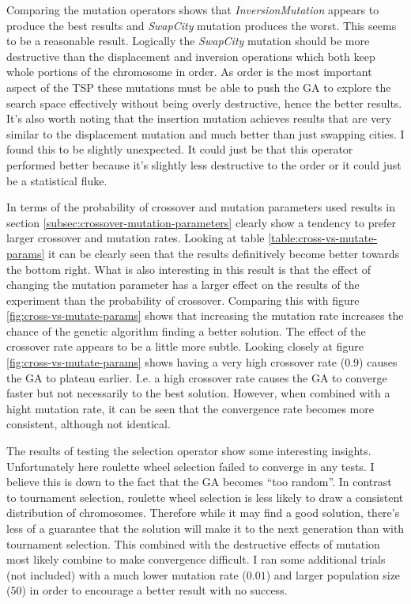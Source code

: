\documentclass[journal]{IEEEtran}
\begin{document}
Comparing the mutation operators shows that \textit{InversionMutation} appears to produce the best results and \textit{SwapCity} mutation produces the worst. This seems to be a reasonable result. Logically the \textit{SwapCity} mutation should be more destructive than the displacement and inversion operations which both keep whole portions of the chromosome in order. As order is the most important aspect of the TSP these mutations must be able to push the GA to explore the search space effectively without being overly destructive, hence the better results. It's also worth noting that the insertion mutation achieves results that are very similar to the displacement mutation and much better than just swapping cities. I found this to be slightly unexpected. It could just be that this operator performed better because it's slightly less destructive to the order or it could just be a statistical fluke.

In terms of the probability of crossover and mutation parameters used results in section \ref{subsec:crossover-mutation-parameters} clearly show a tendency to prefer larger crossover and mutation rates. Looking at table \ref{table:cross-vs-mutate-params} it can be clearly seen that the results definitively become better towards the bottom right. What is also interesting in this result is that the effect of changing the mutation parameter has a larger effect on the results of the experiment than the probability of crossover. Comparing this with figure \ref{fig:cross-vs-mutate-params} shows that increasing the mutation rate increases the chance of the genetic algorithm finding a better solution. The effect of the crossover rate appears to be a little more subtle. Looking closely at figure \ref{fig:cross-vs-mutate-params} shows having a very high crossover rate ($0.9$) causes the GA to plateau earlier. I.e. a high crossover rate causes the GA to converge faster but not necessarily to the best solution. However, when combined with a hight mutation rate, it can be seen that the convergence rate becomes more consistent, although not identical.

The results of testing the selection operator show some interesting insights. Unfortunately here roulette wheel selection failed to converge in any tests. I believe this is down to the fact that the GA becomes ``too random''. In contrast to tournament selection, roulette wheel selection is less likely to draw a consistent distribution of chromosomes. Therefore while it may find a good solution, there's less of a guarantee that the solution will make it to the next generation than with tournament selection. This combined with the destructive effects of mutation most likely combine to make convergence difficult. I ran some additional trials (not included) with a much lower mutation rate ($0.01$) and larger population size ($50$) in order to encourage a better result with no success.
\end{document}
